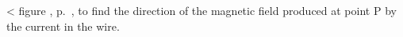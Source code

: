 <%
figure ,
p.~\pageref{fig:field-lines-of-wire-handedness}, to find the direction of the magnetic field produced 
at point P by the current in the wire.
